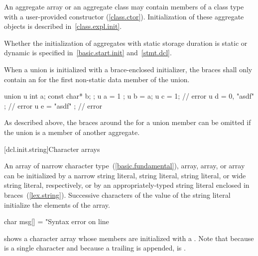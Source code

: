 \pnum
{}%
\enternote
An aggregate array or an aggregate class may contain members of a
class type with a user-provided constructor (\ref{class.ctor}).
Initialization of these aggregate objects is described in~\ref{class.expl.init}.
\exitnote

\pnum
\enternote Whether the initialization of aggregates with static storage duration is static or dynamic is specified in~\ref{basic.start.init} and~\ref{stmt.dcl}. \exitnote

\pnum
{}%
When a union is initialized with a brace-enclosed initializer,
the braces shall only contain an
for the first non-static data member of the union.
\enterexample

\begin{codeblock}
union u { int a; const char* b; };
u a = { 1 };
u b = a;
u c = 1;                        // error
u d = { 0, "asdf" };            // error
u e = { "asdf" };               // error
\end{codeblock}
\exitexample

\pnum
\enternote
As described above,
the braces around the
for a union member can be omitted if the
union is a member of another aggregate.
\exitnote

[dcl.init.string]{Character arrays}%

\pnum
An array of narrow character type~(\ref{basic.fundamental}),
 array,
 array,
or  array
can be initialized by a
narrow string literal,  string literal,  string
literal, or wide string literal,
respectively, or by an appropriately-typed string literal enclosed in
braces~(\ref{lex.string}).
%
Successive
characters of the
value of the string literal
initialize the elements of the array.
\enterexample

\begin{codeblock}
char msg[] = "Syntax error on line %
\end{codeblock}

shows a character array whose members are initialized
with a
.
Note that because
is a single character and
because a trailing
is appended,
is
.
\exitexample

